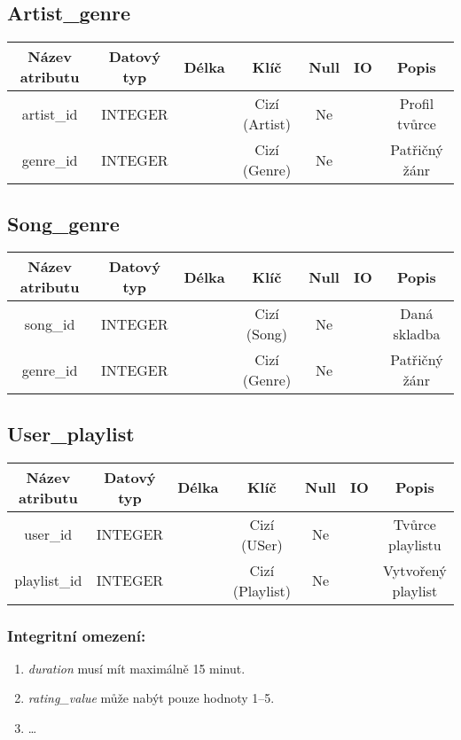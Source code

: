 \subsection*{Artist\_genre}
\begin{tabular}{ |c|c c c c c|c| }
    \hline
    \textbf{Název atributu} & \textbf{Datový typ} & \textbf{Délka} & \textbf{Klíč} & \textbf{Null} & \textbf{IO} & \textbf{Popis}                         \\
    \hline
    artist\_id              & INTEGER             &                & Cizí (Artist) & Ne            &             & Profil tvůrce  \\
    genre\_id               & INTEGER             &                & Cizí (Genre)  & Ne            &             & Patřičný žánr  \\
    \hline
\end{tabular}
\bigskip

\subsection*{Song\_genre}
\begin{tabular}{ |c|c c c c c|c| }
    \hline
    \textbf{Název atributu} & \textbf{Datový typ} & \textbf{Délka} & \textbf{Klíč} & \textbf{Null} & \textbf{IO} & \textbf{Popis}                         \\
    \hline
    song\_id                & INTEGER             &                & Cizí (Song)   & Ne            &             & Daná skladba   \\
    genre\_id               & INTEGER             &                & Cizí (Genre)  & Ne            &             & Patřičný žánr  \\
    \hline
\end{tabular}
\bigskip

\subsection*{User\_playlist}
\begin{tabular}{ |c|c c c c c|c| }
    \hline
    \textbf{Název atributu} & \textbf{Datový typ} & \textbf{Délka} & \textbf{Klíč}   & \textbf{Null} & \textbf{IO} & \textbf{Popis}                         \\
    \hline
    user\_id                & INTEGER             &                & Cizí (USer)     & Ne            &             & Tvůrce playlistu   \\
    playlist\_id            & INTEGER             &                & Cizí (Playlist) & Ne            &             & Vytvořený playlist \\
    \hline
\end{tabular}
\bigskip

\subsubsection*{Integritní omezení:}
\begin{enumerate}
    \item \textit{duration} musí mít maximálně 15 minut.
    \item \textit{rating\_value} může nabýt pouze hodnoty 1--5.
    \item \ldots
\end{enumerate}